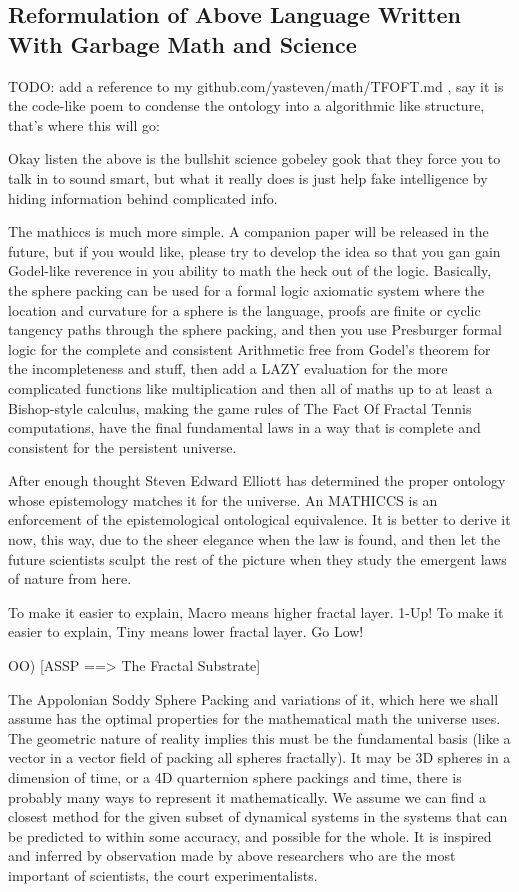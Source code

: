 \documentclass[11pt,a4paper]{article}
\begin{document}
\subsection{
Reformulation of Above Language Written With Garbage Math and Science  
}

TODO: add a reference to my github.com/yasteven/math/TFOFT.md , say it is the code-like poem to condense the ontology into a algorithmic like structure, that's where this will go:

Okay listen the above is the bullshit science gobeley gook that they
force you to talk in to sound smart, but what it really does is just
help fake intelligence by hiding information behind complicated info.

The mathiccs is much more simple. A companion paper will be released
in the future, but if you would like, please try to develop the idea
so that you gan gain Godel-like reverence in you ability to math the
heck out of the logic. Basically, the sphere packing can be used for
a formal logic axiomatic system where the location and curvature for
a sphere is the language, proofs are finite or cyclic tangency paths
through the sphere packing, and then you use Presburger formal logic
for the complete and consistent Arithmetic free from Godel's theorem
for the incompleteness and stuff, then add a LAZY evaluation for the
more complicated functions like multiplication and then all of maths
up to at least a Bishop-style calculus, making the game rules of The
Fact Of Fractal Tennis computations, have the final fundamental laws
in a way that is complete and consistent for the persistent universe.  

After enough thought Steven Edward Elliott has determined the proper
ontology whose epistemology matches it for the universe. An MATHICCS 
is an enforcement of the epistemological ontological equivalence. It 
is better to derive it now, this way, due to the sheer elegance when
the law is found, and then let the future scientists sculpt the rest
of the picture when they study the emergent laws of nature from here.

To make it easier to explain, Macro means higher fractal layer. 1-Up!
To make it easier to explain, Tiny means lower fractal layer. Go Low!

OO) [ASSP ==> The Fractal Substrate]

The Appolonian Soddy Sphere Packing and variations of it, which here
we shall assume has the optimal properties for the mathematical math
the universe uses. The geometric nature of reality implies this must
be the fundamental basis (like a vector in a vector field of packing
all spheres fractally). It may be 3D spheres in a dimension of time,
or a 4D quarternion sphere packings and time, there is probably many
ways to represent it mathematically. We assume we can find a closest
method for the given subset of dynamical systems in the systems that
can be predicted to within some accuracy, and possible for the whole.
It is inspired and inferred by observation made by above researchers
who are the most important of scientists, the court experimentalists. 
\end{document}
